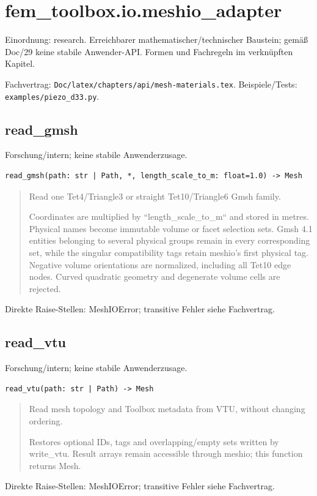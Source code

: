 \section{fem\_toolbox.io.meshio\_adapter}
Einordnung: research. Erreichbarer mathematischer/technischer Baustein; gemäß Doc/29 keine stabile Anwender-API. Formen und Fachregeln im verknüpften Kapitel.
\par Fachvertrag: \nolinkurl{Doc/latex/chapters/api/mesh-materials.tex}. Beispiele/Tests:
\nolinkurl{examples/piezo_d33.py}.
\subsection{read\_gmsh}
Forschung/intern; keine stabile Anwenderzusage.
\begin{lstlisting}
read_gmsh(path: str | Path, *, length_scale_to_m: float=1.0) -> Mesh
\end{lstlisting}
\begin{quote}
Read one Tet4/Triangle3 or straight Tet10/Triangle6 Gmsh family.\par Coordinates are multiplied by ``length\_scale\_to\_m`` and stored in metres. Physical names become immutable volume or facet selection sets. Gmsh 4.1 entities belonging to several physical groups remain in every corresponding set, while the singular compatibility tags retain meshio's first physical tag. Negative volume orientations are normalized, including all Tet10 edge nodes. Curved quadratic geometry and degenerate volume cells are rejected.
\end{quote}
Direkte Raise-Stellen: MeshIOError; transitive Fehler siehe Fachvertrag.
\subsection{read\_vtu}
Forschung/intern; keine stabile Anwenderzusage.
\begin{lstlisting}
read_vtu(path: str | Path) -> Mesh
\end{lstlisting}
\begin{quote}
Read mesh topology and Toolbox metadata from VTU, without changing ordering.\par Restores optional IDs, tags and overlapping/empty sets written by write\_vtu. Result arrays remain accessible through meshio; this function returns Mesh.
\end{quote}
Direkte Raise-Stellen: MeshIOError; transitive Fehler siehe Fachvertrag.
